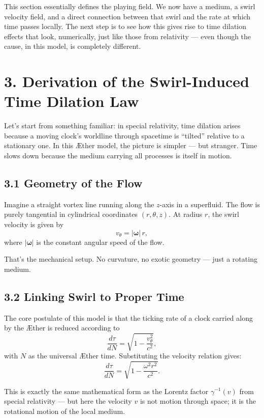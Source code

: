 \documentclass[11pt]{article}
\begin{document}
This section essentially defines the playing field. We now have a medium, a swirl velocity field, and a direct connection between that swirl and the rate at which time passes locally. The next step is to see how this gives rise to time dilation effects that look, numerically, just like those from relativity — even though the cause, in this model, is completely different.

\section*{3. Derivation of the Swirl-Induced Time Dilation Law}

Let’s start from something familiar: in special relativity, time dilation arises because a moving clock’s worldline through spacetime is “tilted” relative to a stationary one. In this Æther model, the picture is simpler — but stranger. Time slows down because the medium carrying all processes is itself in motion.

\subsection*{3.1 Geometry of the Flow}

Imagine a straight vortex line running along the $z$-axis in a superfluid. The flow is purely tangential in cylindrical coordinates $(r, \theta, z)$. At radius $r$, the swirl velocity is given by
\[
v_\theta = |\boldsymbol{\omega}| \, r,
\]
where $|\boldsymbol{\omega}|$ is the constant angular speed of the flow.

That’s the mechanical setup. No curvature, no exotic geometry — just a rotating medium.

\subsection*{3.2 Linking Swirl to Proper Time}

The core postulate of this model is that the ticking rate of a clock carried along by the Æther is reduced according to
\[
\frac{d\tau}{dN} = \sqrt{1 - \frac{v_\theta^2}{c^2}},
\]
with $N$ as the universal Æther time. Substituting the velocity relation gives:
\[
\frac{d\tau}{dN} = \sqrt{1 - \frac{\omega^2 r^2}{c^2}}.
\]

This is exactly the same mathematical form as the Lorentz factor $\gamma^{-1}(v)$ from special relativity — but here the velocity $v$ is not motion through space; it is the rotational motion of the local medium.
\end{document}
